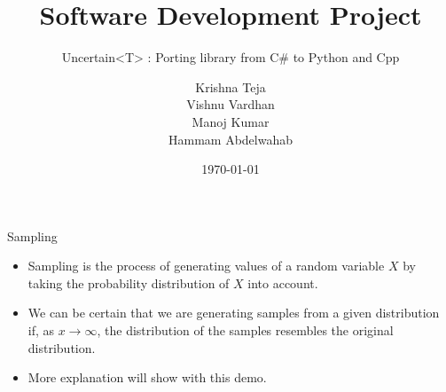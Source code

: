 \documentclass{beamer}
\author[Name]{ Krishna Teja\\  Vishnu Vardhan\\  Manoj Kumar \\ Hammam Abdelwahab}
\title{Software Development Project}
\subtitle{Uncertain<T> : Porting library from C\# to Python and Cpp}
\institute[HBRS]{Hochschule Bonn-Rhein-Sieg}
\date{\today}
\begin{document}
{
\begin{frame}
\titlepage 
\end{frame}
}

\begin{frame}{Sampling}
\begin{itemize}
\item Sampling is the process of generating values of a random variable  $X$  by taking the probability distribution of  $X$  into account.
\item We can be certain that we are generating samples from a given distribution if, as  $x \to \infty$, the distribution of the samples resembles the original distribution.

\item More explanation will show with this demo. 
\end{itemize}

\end{frame}

\begin{frame}

\end{frame}
\end{document}

